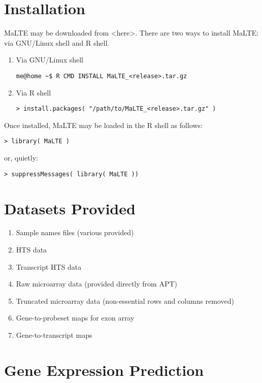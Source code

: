 \documentclass[a4paper,12pt]{article}
\begin{document}
\section{Installation}
\label{installation}
MaLTE may be downloaded from \textless here\textgreater. There are two ways to install MaLTE: via GNU/Linux shell and \textsf{R} shell.

\begin{enumerate}
\item Via GNU/Linux shell
\begin{verbatim}
me@home ~$ R CMD INSTALL MaLTE_<release>.tar.gz
\end{verbatim}

\item Via \textsf{R} shell
\begin{verbatim}
> install.packages( "/path/to/MaLTE_<release>.tar.gz" )
\end{verbatim}
\end{enumerate}

Once installed, MaLTE may be loaded in the R shell as follows:
\begin{verbatim}
> library( MaLTE )
\end{verbatim}

or, quietly:

\begin{verbatim}
> suppressMessages( library( MaLTE ))
\end{verbatim}

\section{Datasets Provided}
\label{datasets}
\begin{enumerate}
\item Sample names files (various provided)
\item HTS data
\item Transcript HTS data
\item Raw microarray data (provided directly from APT)
\item Truncated microarray data (non-essential rows and columns removed)
\item Gene-to-probeset maps for exon array
\item Gene-to-transcript maps
\end{enumerate}

\section{Gene Expression Prediction}
\label{gep}
\end{document}
